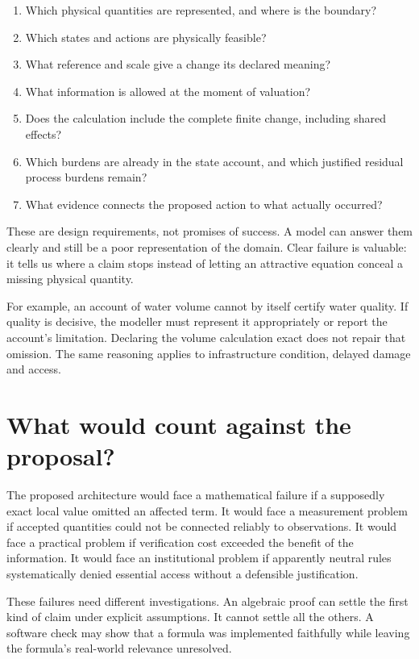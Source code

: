 \begin{enumerate}
\item Which physical quantities are represented, and where is the boundary?
\item Which states and actions are physically feasible?
\item What reference and scale give a change its declared meaning?
\item What information is allowed at the moment of valuation?
\item Does the calculation include the complete finite change, including shared effects?
\item Which burdens are already in the state account, and which justified residual process burdens remain?
\item What evidence connects the proposed action to what actually occurred?
\end{enumerate}

These are design requirements, not promises of success. A model can answer them clearly and still be a poor representation of the domain. Clear failure is valuable: it tells us where a claim stops instead of letting an attractive equation conceal a missing physical quantity.

For example, an account of water volume cannot by itself certify water quality. If quality is decisive, the modeller must represent it appropriately or report the account's limitation. Declaring the volume calculation exact does not repair that omission. The same reasoning applies to infrastructure condition, delayed damage and access.

\section{What would count against the proposal?}
The proposed architecture would face a mathematical failure if a supposedly exact local value omitted an affected term. It would face a measurement problem if accepted quantities could not be connected reliably to observations. It would face a practical problem if verification cost exceeded the benefit of the information. It would face an institutional problem if apparently neutral rules systematically denied essential access without a defensible justification.

These failures need different investigations. An algebraic proof can settle the first kind of claim under explicit assumptions. It cannot settle all the others. A software check may show that a formula was implemented faithfully while leaving the formula's real-world relevance unresolved.

